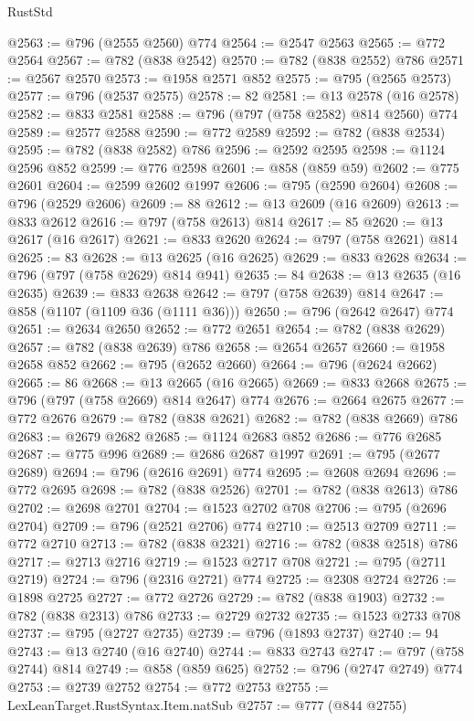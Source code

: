 \begin{lexlean}{RustStd}
\begin{coremodule}
@2563 := @796 (@2555 @2560) @774
@2564 := @2547 @2563
@2565 := @772 @2564
@2567 := @782 (@838 @2542)
@2570 := @782 (@838 @2552) @786
@2571 := @2567 @2570
@2573 := @1958 @2571 @852
@2575 := @795 (@2565 @2573)
@2577 := @796 (@2537 @2575)
@2578 := 82
@2581 := @13 @2578 (@16 @2578)
@2582 := @833 @2581
@2588 := @796 (@797 (@758 @2582) @814 @2560) @774
@2589 := @2577 @2588
@2590 := @772 @2589
@2592 := @782 (@838 @2534)
@2595 := @782 (@838 @2582) @786
@2596 := @2592 @2595
@2598 := @1124 @2596 @852
@2599 := @776 @2598
@2601 := @858 (@859 @59)
@2602 := @775 @2601
@2604 := @2599 @2602 @1997
@2606 := @795 (@2590 @2604)
@2608 := @796 (@2529 @2606)
@2609 := 88
@2612 := @13 @2609 (@16 @2609)
@2613 := @833 @2612
@2616 := @797 (@758 @2613) @814
@2617 := 85
@2620 := @13 @2617 (@16 @2617)
@2621 := @833 @2620
@2624 := @797 (@758 @2621) @814
@2625 := 83
@2628 := @13 @2625 (@16 @2625)
@2629 := @833 @2628
@2634 := @796 (@797 (@758 @2629) @814 @941)
@2635 := 84
@2638 := @13 @2635 (@16 @2635)
@2639 := @833 @2638
@2642 := @797 (@758 @2639) @814
@2647 := @858 (@1107 (@1109 @36 (@1111 @36)))
@2650 := @796 (@2642 @2647) @774
@2651 := @2634 @2650
@2652 := @772 @2651
@2654 := @782 (@838 @2629)
@2657 := @782 (@838 @2639) @786
@2658 := @2654 @2657
@2660 := @1958 @2658 @852
@2662 := @795 (@2652 @2660)
@2664 := @796 (@2624 @2662)
@2665 := 86
@2668 := @13 @2665 (@16 @2665)
@2669 := @833 @2668
@2675 := @796 (@797 (@758 @2669) @814 @2647) @774
@2676 := @2664 @2675
@2677 := @772 @2676
@2679 := @782 (@838 @2621)
@2682 := @782 (@838 @2669) @786
@2683 := @2679 @2682
@2685 := @1124 @2683 @852
@2686 := @776 @2685
@2687 := @775 @996
@2689 := @2686 @2687 @1997
@2691 := @795 (@2677 @2689)
@2694 := @796 (@2616 @2691) @774
@2695 := @2608 @2694
@2696 := @772 @2695
@2698 := @782 (@838 @2526)
@2701 := @782 (@838 @2613) @786
@2702 := @2698 @2701
@2704 := @1523 @2702 @708
@2706 := @795 (@2696 @2704)
@2709 := @796 (@2521 @2706) @774
@2710 := @2513 @2709
@2711 := @772 @2710
@2713 := @782 (@838 @2321)
@2716 := @782 (@838 @2518) @786
@2717 := @2713 @2716
@2719 := @1523 @2717 @708
@2721 := @795 (@2711 @2719)
@2724 := @796 (@2316 @2721) @774
@2725 := @2308 @2724
@2726 := @1898 @2725
@2727 := @772 @2726
@2729 := @782 (@838 @1903)
@2732 := @782 (@838 @2313) @786
@2733 := @2729 @2732
@2735 := @1523 @2733 @708
@2737 := @795 (@2727 @2735)
@2739 := @796 (@1893 @2737)
@2740 := 94
@2743 := @13 @2740 (@16 @2740)
@2744 := @833 @2743
@2747 := @797 (@758 @2744) @814
@2749 := @858 (@859 @625)
@2752 := @796 (@2747 @2749) @774
@2753 := @2739 @2752
@2754 := @772 @2753
@2755 := LexLeanTarget.RustSyntax.Item.natSub
@2757 := @777 (@844 @2755)

\end{coremodule}
\end{lexlean}
